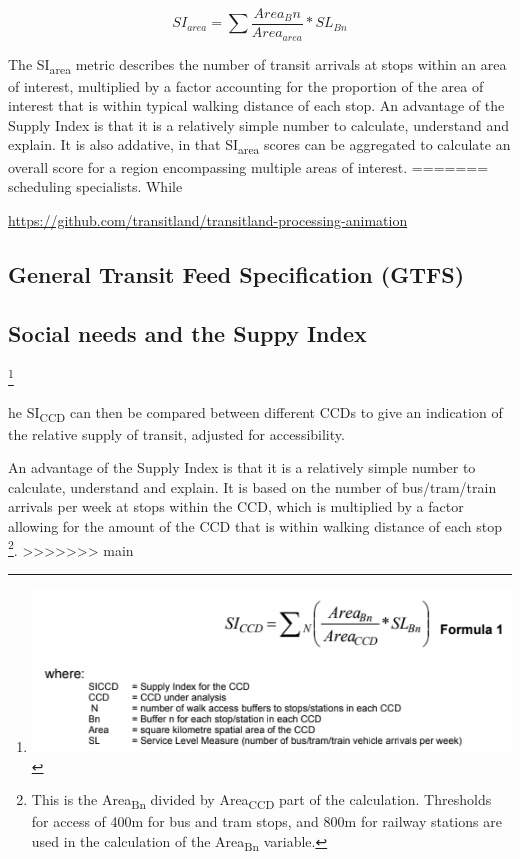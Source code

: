 \documentclass[numbered]{trbunofficial}
\begin{document}
\begin{equation}
\label{eq:supply_index}
  SI_{area} = \sum{\frac{Area{_Bn}}{Area_{area}}*SL_{Bn}}
\end{equation}

The SI\textsubscript{area} metric describes the number of transit
arrivals at stops within an area of interest, multiplied by a factor
accounting for the proportion of the area of interest that is within
typical walking distance of each stop. An advantage of the Supply Index
is that it is a relatively simple number to calculate, understand and
explain. It is also addative, in that SI\textsubscript{area} scores can
be aggregated to calculate an overall score for a region encompassing
multiple areas of interest.
=======
scheduling specialists. While \citet{Wong:2013aa}

\url{https://github.com/transitland/transitland-processing-animation}

\hypertarget{general-transit-feed-specification-gtfs}{%
\subsection{General Transit Feed Specification
(GTFS)}\label{general-transit-feed-specification-gtfs}}

\hypertarget{social-needs-and-the-suppy-index}{%
\subsection{Social needs and the Suppy
Index}\label{social-needs-and-the-suppy-index}}

\footnote{\includegraphics{Supply_index.png}}

he SI\textsubscript{CCD} can then be compared between different CCDs to
give an indication of the relative supply of transit, adjusted for
accessibility.

An advantage of the Supply Index is that it is a relatively simple
number to calculate, understand and explain. It is based on the number
of bus/tram/train arrivals per week at stops within the CCD, which is
multiplied by a factor allowing for the amount of the CCD that is within
walking distance of each stop \footnote{This is the
  Area\textsubscript{Bn} divided by Area\textsubscript{CCD} part of the
  calculation. Thresholds for access of 400m for bus and tram stops, and
  800m for railway stations are used in the calculation of the
  Area\textsubscript{Bn} variable.}.
>>>>>>> main
\end{document}
